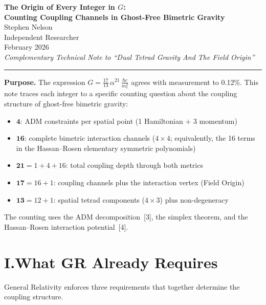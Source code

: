 \documentclass[11pt]{article}
\begin{document}
\begin{center}
{\Large\bfseries The Origin of Every Integer in $G$:\\[4pt] Counting Coupling Channels in Ghost-Free Bimetric Gravity}\\[12pt]
{\normalsize Stephen Nelson}\\
{\small Independent Researcher}\\[8pt]
{\small February 2026}\\[6pt]
{\small\itshape Complementary Technical Note to ``Dual Tetrad Gravity And The Field Origin''}
\end{center}

\vspace{0.5cm}
\hrule
\vspace{0.5cm}

\textbf{Purpose.}\quad
The expression $G = \frac{17}{13}\,\alpha^{21}\,\frac{\hbar c}{m_e^2}$ agrees with measurement to 0.12\%.
This note traces each integer to a specific counting question about the coupling structure of ghost-free bimetric gravity:
%
\begin{itemize}[nosep,leftmargin=2em]
\item $\mathbf{4}$: ADM constraints per spatial point (1 Hamiltonian $+$ 3 momentum)
\item $\mathbf{16}$: complete bimetric interaction channels ($4 \times 4$; equivalently, the 16 terms in the Hassan--Rosen elementary symmetric polynomials)
\item $\mathbf{21} = 1 + 4 + 16$: total coupling depth through both metrics
\item $\mathbf{17} = 16 + 1$: coupling channels plus the interaction vertex (Field Origin)
\item $\mathbf{13} = 12 + 1$: spatial tetrad components ($4 \times 3$) plus non-degeneracy
\end{itemize}
%
The counting uses the ADM decomposition~[3], the simplex theorem, and the Hassan--Rosen interaction potential~[4].

\section*{I.\quad What GR Already Requires}

General Relativity enforces three requirements that together determine the coupling structure.
\end{document}
